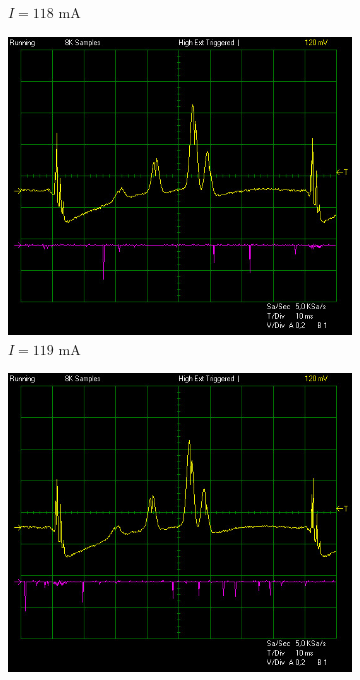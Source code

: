 \documentclass{article}
\begin{document}
\begin{figure}[h]
\begin{subfigure}[b]{0.3\textwidth}
        \caption{$I=118$ mA}
        \label{fig:118mA}
    \end{subfigure}
    \begin{subfigure}[b]{0.3\textwidth}
        \includegraphics[width=\textwidth]{Figures/2/Tconst20C/119mA.jpg}
        \caption{$I=119$ mA}
        \label{fig:119mA}
    \end{subfigure}
    \begin{subfigure}[b]{0.3\textwidth}
        \includegraphics[width=\textwidth]{Figures/2/Tconst20C/120mA.jpg}

\end{subfigure}
\end{figure}
\end{document}
